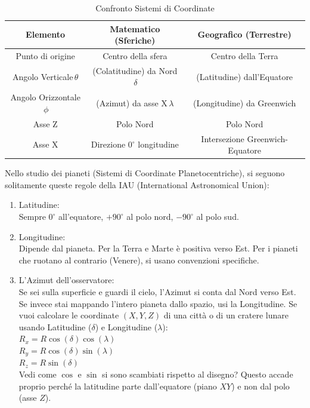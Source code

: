 \documentclass[a4paper,14pt]{article}
\begin{document}
\begin{table}[h!]
\begin{center}
\begin{tabular}{|c|c|c|}
\hline
\textbf{Elemento}& \textbf{Matematico (Sferiche)}& \textbf{Geografico (Terrestre)}\\
\hline
Punto di origine& Centro della sfera &Centro della Terra\\
\hline
Angolo Verticale\(\,\theta \)& (Colatitudine) da Nord\(\,\delta \)& (Latitudine) dall'Equatore\\
\hline
Angolo Orizzontale\(\,\phi \)& (Azimut) da asse X\(\,\lambda \)& (Longitudine) da Greenwich\\
\hline
Asse Z& Polo Nord& Polo Nord\\
\hline
Asse X& Direzione \(0^{\circ }\) longitudine& Intersezione Greenwich-Equatore\\
\hline
\end{tabular}
\end{center}
\caption{Confronto Sistemi di Coordinate}
\end{table}
Nello studio dei pianeti (Sistemi di Coordinate Planetocentriche), si seguono solitamente queste regole della IAU (International Astronomical Union):\\
\begin{enumerate}

\item Latitudine:\\
Sempre \(0^{\circ }\) all'equatore, \(+90^{\circ }\) al polo nord, \(-90^{\circ }\) al polo sud.\\
\item Longitudine:\\
Dipende dal pianeta. Per la Terra e Marte è positiva verso Est. Per i pianeti che ruotano al contrario (Venere), si usano convenzioni specifiche.
\item L'Azimut dell'osservatore:\\
Se sei sulla superficie e guardi il cielo, l'Azimut si conta dal Nord verso Est. Se invece stai mappando l'intero pianeta dallo spazio, usi la Longitudine.
Se vuoi calcolare le coordinate \((X,Y,Z)\) di una città o di un cratere lunare usando Latitudine (\(\delta \)) e Longitudine (\(\lambda \)):\\
\(R_{x}=R\cos (\delta )\cos (\lambda )\)\\
\(R_{y}=R\cos (\delta )\sin (\lambda )\)\\
\(R_{z}=R\sin (\delta )\)\\
Vedi come \(\cos \) e \(\sin \) si sono scambiati rispetto al disegno? Questo accade proprio perché la latitudine parte dall'equatore (piano \(XY\)) e non dal polo (asse \(Z\)).
\end{enumerate}
\end{document}
